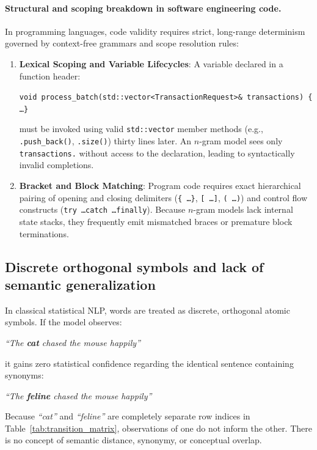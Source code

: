 \documentclass[../../main.tex]{subfiles}
\begin{document}
\paragraph{Structural and scoping breakdown in software engineering code.}
In programming languages, code validity requires strict, long-range determinism governed by context-free grammars and scope resolution rules:
\begin{enumerate}
    \item \textbf{Lexical Scoping and Variable Lifecycles}: A variable declared in a function header:
    \begin{center}
    \texttt{void process\_batch(std::vector<TransactionRequest>\& transactions) \{ \dots \}}
    \end{center}
    must be invoked using valid \texttt{std::vector} member methods (e.g., \texttt{.push\_back()}, \texttt{.size()}) thirty lines later. An $n$-gram model sees only \texttt{transactions.} without access to the declaration, leading to syntactically invalid completions.
    \item \textbf{Bracket and Block Matching}: Program code requires exact hierarchical pairing of opening and closing delimiters (\texttt{\{ \dots \}}, \texttt{[ \dots ]}, \texttt{( \dots )}) and control flow constructs (\texttt{try \dots catch \dots finally}). Because $n$-gram models lack internal state stacks, they frequently emit mismatched braces or premature block terminations.
\end{enumerate}

\subsection{Discrete orthogonal symbols and lack of semantic generalization}
In classical statistical NLP, words are treated as discrete, orthogonal atomic symbols. If the model observes:
\begin{center}
\textit{``The \textbf{cat} chased the mouse happily''}
\end{center}
it gains zero statistical confidence regarding the identical sentence containing synonyms:
\begin{center}
\textit{``The \textbf{feline} chased the mouse happily''}
\end{center}
Because \textit{``cat''} and \textit{``feline''} are completely separate row indices in Table~\ref{tab:transition_matrix}, observations of one do not inform the other. There is no concept of semantic distance, synonymy, or conceptual overlap.
\end{document}

